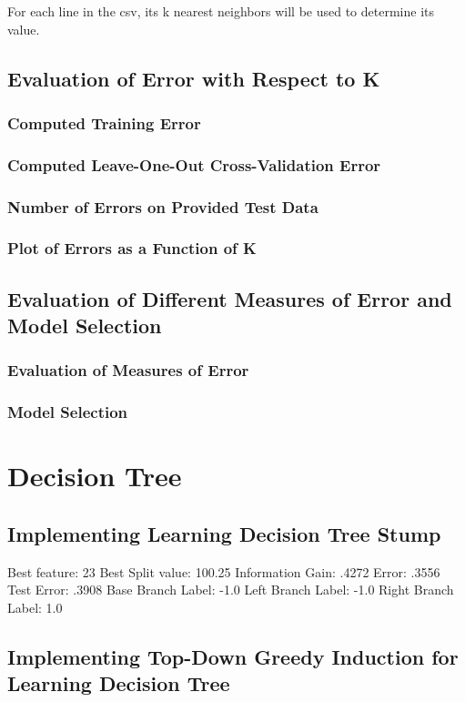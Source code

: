 \documentclass[letterpaper,10pt]{article}
\begin{document}
For each line in the csv, its k nearest neighbors will be used to determine its value.\\

\subsection{Evaluation of Error with Respect to K}
\subsubsection{Computed Training Error}
\subsubsection{Computed Leave-One-Out Cross-Validation Error}
\subsubsection{Number of Errors on Provided Test Data}
\subsubsection{Plot of Errors as a Function of K}

\subsection{Evaluation of Different Measures of Error and Model Selection}
\subsubsection{Evaluation of Measures of Error}
\subsubsection{Model Selection}

\section{Decision Tree}
\subsection{Implementing Learning Decision Tree Stump}
Best feature: 23
Best Split value: 100.25
Information Gain: .4272
Error: .3556
Test Error: .3908 
Base Branch Label: -1.0
Left Branch Label: -1.0
Right Branch Label: 1.0
\subsection{Implementing Top-Down Greedy Induction for Learning Decision Tree}
\end{document}
